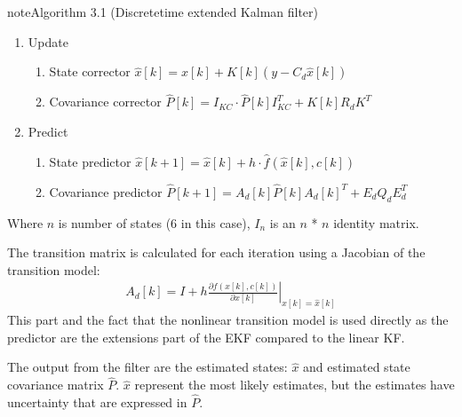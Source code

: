 \documentclass[review]{elsarticle}
\begin{document}
\begin{sphinxadmonition}{note}{Algorithm 3.1 (Discrete\sphinxhyphen{}time extended Kalman filter)}
\begin{enumerate}
\begin{enumerate}
\item {} 
\sphinxAtStartPar
Update
\begin{enumerate}
%
\item {} 
\sphinxAtStartPar
State corrector
\(\hat{x}[k] = \hat{x}[k] + K[k] (y - C_d \hat{x}[k]) \)

\item {} 
\sphinxAtStartPar
Covariance corrector
\(\hat{P}[k] = I_{KC} \cdot \hat{P}[k] I_{KC}^T + K[k] R_d K^T \)

\end{enumerate}

\item {} 
\sphinxAtStartPar
Predict
\begin{enumerate}
%
\item {} 
\sphinxAtStartPar
State predictor
\(\hat{x}[k+1] = \hat{x}[k] + h \cdot \hat{f}(\hat{x}[k], c[k])\)

\item {} 
\sphinxAtStartPar
Covariance predictor
\(\hat{P}[k+1] = A_d[k]  \hat{P}[k] A_d[k]^T + E_d Q_d E_d^T \)

\end{enumerate}

\end{enumerate}

\end{enumerate}
\end{sphinxadmonition}

\sphinxAtStartPar
Where \(n\) is number of states (6 in this case), \(I_n\) is an \(n\) * \(n\) identity matrix.

\sphinxAtStartPar
The transition matrix is calculated for each iteration using a Jacobian of the transition model:
\begin{equation}\label{equation:04.01_EK:eqjacobi}
\begin{split}A_d[k] = I + h \left. \frac{\partial f \left(x[k],c[k] \right)}{\partial x[k]} \right|_{x[k]=\hat{x}[k]}\end{split}
\end{equation}
\sphinxAtStartPar
This part and the fact that the nonlinear transition model is used directly as the predictor are the extensions part of the EKF compared to the linear KF.

\sphinxAtStartPar
The output from the filter are the estimated states: \(\hat{x}\) and estimated state covariance matrix \(\hat{P}\). \(\hat{x}\) represent the most likely estimates, but the estimates have uncertainty that are expressed in \(\hat{P}\).
\end{document}
